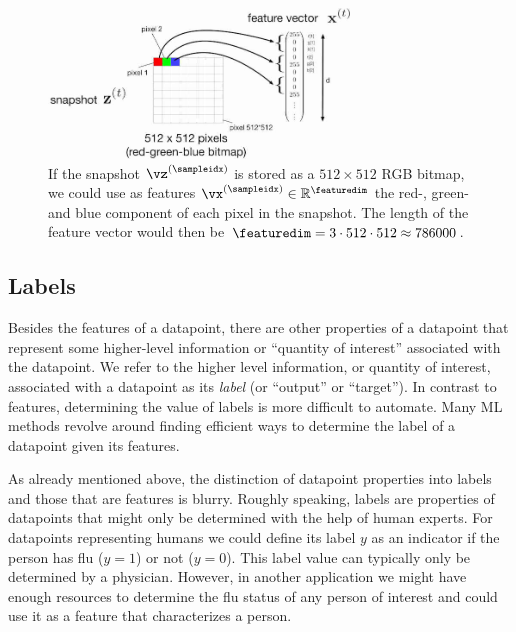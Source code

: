 \documentclass[12pt]{report}
\begin{document}
\begin{figure}[htbp]
	\begin{center}
		\includegraphics[width=8cm]{RumbaSnapshotFeature1.jpg}  
	\end{center}
	\caption{If the snapshot $\vz^{(\sampleidx)}$ is stored as a $512 \times 512$ RGB bitmap, we could use as 
		features $\vx^{(\sampleidx)} \in \mathbb{R}^{\featuredim}$ the red-, green- and blue component of each pixel 
		in the snapshot. The length of the feature vector would then be $\featuredim= 3 \cdot 512 \cdot 512 \approx 786000$. }
	\label{fig_snapshot_pixels}
\end{figure}

\subsection{Labels}
\label{sec_labels}

Besides the features of a datapoint, there are other properties of a datapoint that represent 
some higher-level information or ``quantity of interest'' 
associated with the datapoint. We refer to the higher level information, or quantity of 
interest, associated with a datapoint as its \emph{label} (or ``output'' or ``target''). 
In contrast to features, determining the value of labels is more difficult to automate. 
Many ML methods revolve around finding efficient ways to determine the label of a 
datapoint given its features. 

As already mentioned above, the distinction of datapoint properties into 
labels and those that are features is blurry. Roughly speaking, labels are 
properties of datapoints that might only be determined with the help of 
human experts. For datapoints representing humans we could define 
its label $y$ as an indicator if the person has flu ($y=1$) or not ($y=0$). 
This label value can typically only be determined by a physician. However, 
in another application we might have enough resources to determine the 
flu status of any person of interest and could use it as a feature that 
characterizes a person. 
\end{document}
